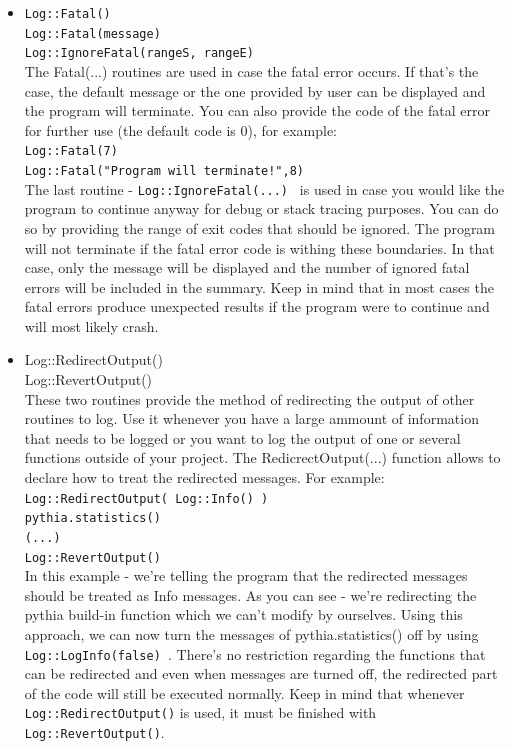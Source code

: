\documentclass[]{Photos_interface_design}
\begin{document}
\begin{itemize}
 \item {\tt Log::Fatal() } \hfill \\
       {\tt Log::Fatal(message) } \hfill \\
       {\tt Log::IgnoreFatal(rangeS, rangeE) } \hfill \\
The Fatal(...) routines are used in case the fatal error occurs. If that's the case, the default message or the one provided by user can be displayed and the program will terminate. You can also provide the code of the fatal error for further use (the default code is 0), for example: \\
{\tt Log::Fatal(7) } \\
{\tt Log::Fatal("Program will terminate!",8) } \\
The last routine - {\tt Log::IgnoreFatal(...) } is used in case you would like the program to continue anyway for debug or stack tracing purposes. You can do so by providing the range of exit codes that should be ignored. The program will not terminate if the fatal error code is withing these boundaries. In that case, only the message will be displayed and the number of ignored fatal errors will be included in the summary. Keep in mind that in most cases the fatal errors produce unexpected results if the program were to continue and will most likely crash.

 \item {Log::RedirectOutput() } \hfill \\
       {Log::RevertOutput()   } \hfill \\
These two routines provide the method of redirecting the output of other routines to log. Use it whenever you have a large ammount of information that needs to be logged or you want to log the output of one or several functions outside of your project. The RedicrectOutput(...) function allows to declare how to treat the redirected messages. For example: \\
{\tt Log::RedirectOutput( Log::Info() )} \\
{\tt pythia.statistics() } \\
{\tt (...) } \\
{\tt Log::RevertOutput() } \\
In this example - we're telling the program that the redirected messages should be treated as Info messages. As you can see - we're redirecting the pythia build-in function which we can't modify by ourselves. Using this approach, we can now turn the messages of pythia.statistics() off by using {\tt Log::LogInfo(false) }. There's no restriction regarding the functions that can be redirected and even when messages are turned off, the redirected part of the code will still be executed normally. Keep in mind that whenever {\tt Log::RedirectOutput()} is used, it must be finished with {\tt Log::RevertOutput()}.


\end{itemize}
\end{document}
